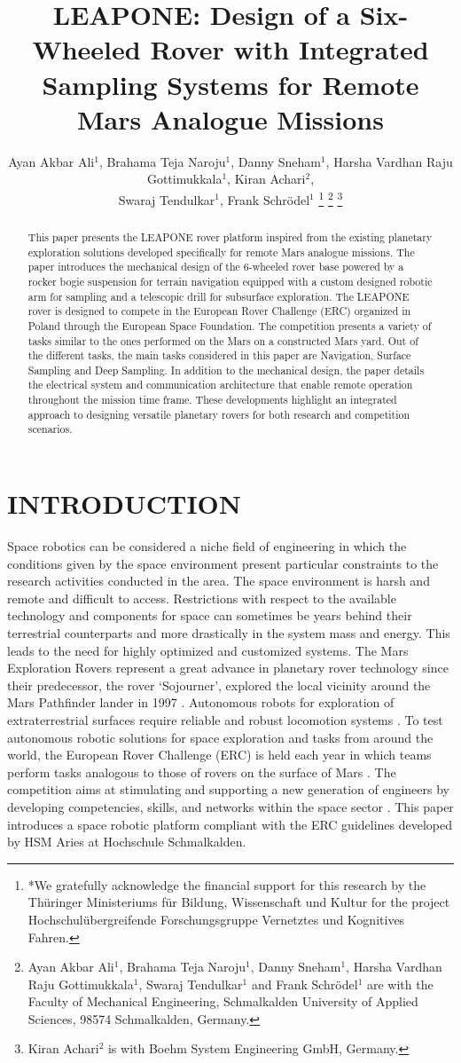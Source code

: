 \documentclass[letterpaper, 10 pt, conference]{ieeeconf}  %
\title{\LARGE \bf
LEAPONE: Design of a Six-Wheeled Rover with Integrated Sampling Systems for Remote Mars Analogue Missions
}
\author{Ayan Akbar Ali$^{1}$, Brahama Teja Naroju$^{1}$, Danny Sneham$^{1}$, Harsha Vardhan Raju Gottimukkala$^{1}$, Kiran Achari$^{2}$,\\ Swaraj Tendulkar$^{1}$, Frank Schrödel$^{1}$ %
\thanks{*We gratefully acknowledge the financial support for this research by the Thüringer Ministeriums für Bildung, Wissenschaft und Kultur for the project Hochschulübergreifende Forschungsgruppe Vernetztes und Kognitives Fahren.}%
\thanks{Ayan Akbar Ali$^{1}$, Brahama Teja Naroju$^{1}$, Danny Sneham$^{1}$, Harsha Vardhan Raju Gottimukkala$^{1}$, Swaraj Tendulkar$^{1}$ and Frank Schrödel$^{1}$ are with the Faculty of Mechanical Engineering, Schmalkalden University of Applied Sciences, 98574 Schmalkalden, Germany.}
\thanks{Kiran Achari$^{2}$ is with Boehm System Engineering GmbH, Germany.}
}
\begin{document}
\maketitle
\thispagestyle{empty}
\pagestyle{empty}

\begin{abstract}
This paper presents the LEAPONE rover platform inspired from the existing planetary exploration solutions developed specifically for remote Mars analogue missions. The paper introduces the mechanical design of the 6-wheeled rover base powered by a rocker bogie suspension for terrain navigation equipped with a custom designed robotic arm for sampling and a telescopic drill for subsurface exploration. The LEAPONE rover is designed to compete in the European Rover Challenge (ERC) organized in Poland through the European Space Foundation. The competition presents a variety of tasks similar to the ones performed on the Mars on a constructed Mars yard. Out of the different tasks, the main tasks considered in this paper are Navigation, Surface Sampling and Deep Sampling. In addition to the mechanical design, the paper details the electrical system and communication architecture that enable remote operation throughout the mission time frame. These developments highlight an integrated approach to designing versatile planetary rovers for both research and competition scenarios. 
\end{abstract}

\section{INTRODUCTION}
Space robotics can be considered a niche field of engineering in which the conditions given by the space environment present particular constraints to the research activities conducted in the area. The space environment is harsh and remote and difficult to access. Restrictions with respect to the available technology and components for space can sometimes be years behind their terrestrial counterparts and more drastically in the system mass and energy. This leads to the need for highly optimized and customized systems. \cite{marstestbed} The Mars Exploration Rovers represent a great advance in planetary rover technology since their predecessor, the rover ‘Sojourner’, explored the local vicinity around the Mars Pathfinder lander in 1997 \cite{mobsub}. Autonomous robots for exploration of extraterrestrial surfaces require reliable and robust locomotion systems \cite{sherpasus}. To test autonomous robotic solutions for space exploration and tasks from around the world, the European Rover Challenge (ERC) is held each year in which teams perform tasks analogous to those of rovers on the surface of Mars \cite{ERC20}. The competition aims at stimulating and supporting a new generation of engineers by developing competencies, skills, and networks within the space sector \cite{ERC20}. This paper introduces a space robotic platform compliant with the ERC guidelines developed by HSM Aries \cite{aries} at Hochschule Schmalkalden.   
\end{document}

